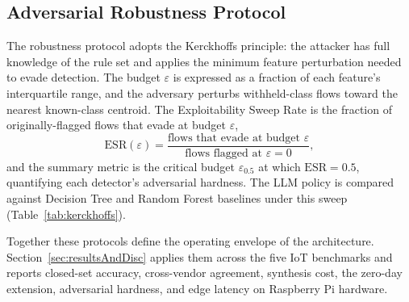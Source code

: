 \subsection{Adversarial Robustness Protocol}
\label{subsec:kerckhoffs}

The robustness protocol adopts the Kerckhoffs principle: the attacker has full
knowledge of the rule set and applies the minimum feature perturbation needed
to evade detection. The budget $\varepsilon$ is expressed as a fraction of each
feature's interquartile range, and the adversary perturbs withheld-class flows
toward the nearest known-class centroid. The Exploitability Sweep Rate is the
fraction of originally-flagged flows that evade at budget $\varepsilon$,
\[
  \mathrm{ESR}(\varepsilon) = \frac{\text{flows that evade at budget } \varepsilon}
                                   {\text{flows flagged at } \varepsilon = 0} ,
\]
and the summary metric is the critical budget $\varepsilon_{0.5}$ at which
$\mathrm{ESR}=0.5$, quantifying each detector's adversarial hardness. The LLM
policy is compared against Decision Tree and Random Forest baselines under this
sweep (Table~\ref{tab:kerckhoffs}).

Together these protocols define the operating envelope of the architecture.
Section~\ref{sec:resultsAndDisc} applies them across the five IoT benchmarks
and reports closed-set accuracy, cross-vendor agreement, synthesis cost, the
zero-day extension, adversarial hardness, and edge latency on Raspberry Pi
hardware.
